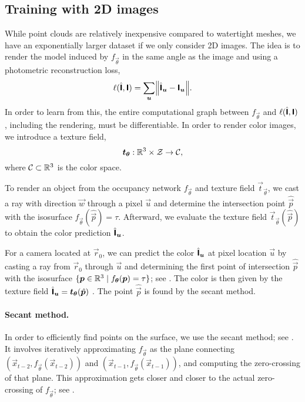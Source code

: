 \subsection{Training with 2D images}

While point clouds are relatively inexpensive compared to watertight meshes, we have an
exponentially larger dataset if we only consider 2D images. The idea is to render the model induced
by $f_{\vec{\theta}}$ in the same angle as the image and using a photometric reconstruction loss, \[
    \ell(\hat{\tens{I}}, \tens{I}) = \sum_{\vec{u}} \lft\| \hat{\tens{I}}_{\vec{u}} - \tens{I}_{\vec{u}} \rgt\|.
\]
In order to learn from this, the entire computational graph between $f_{\vec{\theta}}$ and
$\ell(\hat{\bm{\mathsf{I}}},\bm{\mathsf{I}})$, including the rendering, must be differentiable. In order to
render color images, we introduce a texture field, \[
    \bm{t}_{\bm{\theta}}: \mathbb{R}^3 \times \mathcal{Z} \to \mathcal{C},
\]
where $\mathcal{C} \subset \mathbb{R}^3$ is the color space.

\begin{marginfigure}
    \centering
    \caption{To render an object from the occupancy network $f_{\vec{\theta}}$ and texture field $\vec{t}_{\vec{\theta}}$, we cast a ray with direction $\vec{w}$ through a pixel $\vec{u}$ and determine the intersection point $\hat{\vec{p}}$ with the isosurface $f_{\vec{\theta}}(\hat{\vec{p}}) = \tau$. Afterward, we evaluate the texture field $\vec{t}_{\vec{\theta}}(\hat{\vec{p}})$ to obtain the color prediction $\hat{\bm{\mathsf{I}}}_{\bm{u}}$.}
    \label{fig:differentiable-rendering}
\end{marginfigure}

For a camera located at $\vec{r}_0$, we can predict the color $\hat{\bm{\mathsf{I}}}_{\bm{u}}$ at pixel
location $\vec{u}$ by casting a ray from $\vec{r}_0$ through $\vec{u}$ and determining the first
point of intersection $\hat{\vec{p}}$ with the isosurface $\{ \bm{p} \in \mathbb{R}^3 \mid
    f_{\bm{\theta}}(\bm{p}) = \tau \}$; see . The color is then
given by the texture field $\hat{\bm{\mathsf{I}}}_{\bm{u}} = \bm{t}_{\bm{\theta}}(\hat{\bm{p}})$
\citep{niemeyer2020differentiable}. The point $\hat{\vec{p}}$ is found by the secant method.

\paragraph{Secant method.}

In order to efficiently find points on the surface, we use the secant method; see
. It involves iteratively approximating $f_{\vec{\theta}}$ as the plane connecting
$(\vec{x}_{t-2}, f_{\vec{\theta}}(\vec{x}_{t-2}))$ and $(\vec{x}_{t-1},
    f_{\vec{\theta}}(\vec{x}_{t-1}))$, and computing the zero-crossing of that plane. This
approximation gets closer and closer to the actual zero-crossing of $f_{\vec{\theta}}$; see
.

